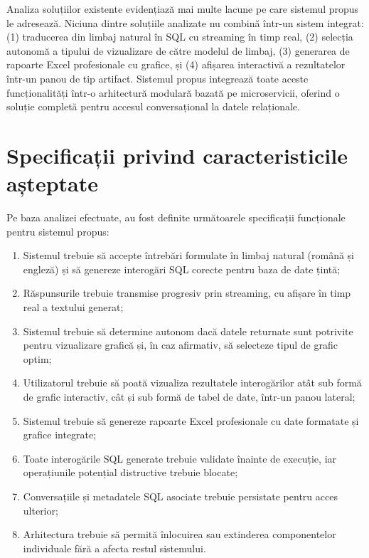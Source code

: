 \documentclass[12pt, a4paper]{report}
\begin{document}
Analiza soluțiilor existente evidențiază mai multe lacune pe care sistemul propus le adresează. Niciuna dintre soluțiile analizate nu combină într-un sistem integrat: (1) traducerea din limbaj natural în SQL cu streaming în timp real, (2) selecția autonomă a tipului de vizualizare de către modelul de limbaj, (3) generarea de rapoarte Excel profesionale cu grafice, și (4) afișarea interactivă a rezultatelor într-un panou de tip artifact. Sistemul propus integrează toate aceste funcționalități într-o arhitectură modulară bazată pe microservicii, oferind o soluție completă pentru accesul conversațional la datele relaționale.

\section{Specificații privind caracteristicile așteptate}

Pe baza analizei efectuate, au fost definite următoarele specificații funcționale pentru sistemul propus:

\begin{enumerate}[nosep]
  \item Sistemul trebuie să accepte întrebări formulate în limbaj natural (română și engleză) și să genereze interogări SQL corecte pentru baza de date țintă;
  \item Răspunsurile trebuie transmise progresiv prin streaming, cu afișare în timp real a textului generat;
  \item Sistemul trebuie să determine autonom dacă datele returnate sunt potrivite pentru vizualizare grafică și, în caz afirmativ, să selecteze tipul de grafic optim;
  \item Utilizatorul trebuie să poată vizualiza rezultatele interogărilor atât sub formă de grafic interactiv, cât și sub formă de tabel de date, într-un panou lateral;
  \item Sistemul trebuie să genereze rapoarte Excel profesionale cu date formatate și grafice integrate;
  \item Toate interogările SQL generate trebuie validate înainte de execuție, iar operațiunile potențial distructive trebuie blocate;
  \item Conversațiile și metadatele SQL asociate trebuie persistate pentru acces ulterior;
  \item Arhitectura trebuie să permită înlocuirea sau extinderea componentelor individuale fără a afecta restul sistemului.
\end{enumerate}
\end{document}
